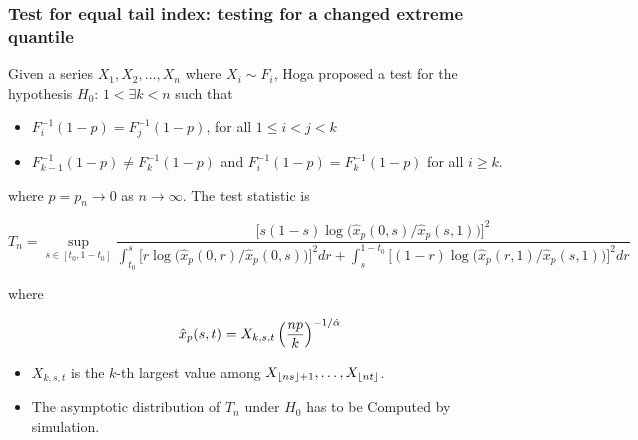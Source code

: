 \documentclass{beamer}
\begin{document}
\begin{frame}
  \frametitle{\small Test for equal tail index: testing for a
    changed extreme quantile}
  Given a series $X_1, X_2, \dots, X_n$ where $X_i \sim F_i$, Hoga
  \cite{hoga:2016} proposed a test for the hypothesis $H_0$:
  $1 < \exists k < n$ such that
  \begin{itemize}
    \item $F_i^{-1}(1 - p) = F_j^{-1}(1 - p)$, for all $1 \leq i < j < k$
    \item $F_{k-1}^{-1}(1 - p) \neq F_k^{-1}(1 - p)$ and
      $F_i^{-1}(1-p) = F_k^{-1}(1-p)$ for all $i \geq k$.
  \end{itemize}
  where $p = p_n \to 0$ as $n \to \infty$. The test statistic is
  \begin{tiny}
  \[
  T_n = \sup_{s \in [t_0, 1 - t_0]}
  \dfrac{  \big[s (1 - s) \log \big(\hat x_p(0, s)/\hat x_p(s, 1)\big)
      \big]^2}{
    \int_{t_0}^s\big[r \log \big( \hat x_p(0, r)/\hat x_p(0, s)
      \big)
      \big]^2 dr
    +
    \int_{s}^{1 - t_0}
    \big[
      (1 - r) \log \big(
      \hat x_p(r, 1)/
      \hat x_p(s, 1)
      \big)
      \big]^2 dr}
  \]
  \end{tiny}
  where
  \begin{small}
  \[
  \hat x_p(s, t) = X_{k, s, t}
  \left({n p \over k}\right)^{-1/{\hat \alpha}}
  \]
  \begin{itemize}
    \item $X_{k, s, t}$ is the $k$-th largest value among
      $X_{\lfloor n s\rfloor + 1}, \dots, X_{\lfloor n t\rfloor}$.
    \item The asymptotic distribution of $T_n$ under $H_0$ has to
      be Computed by simulation.
  \end{itemize}
  \end{small}
\end{frame}
\end{document}
